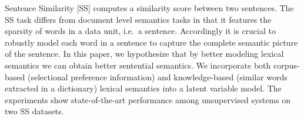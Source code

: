 Sentence Similarity [SS] computes a similarity score between two sentences. The SS task differs from document level semantics tasks in that it features the
 sparsity of words in a data unit, i.e.\ a sentence.  Accordingly it is crucial
 to robustly model each word in a sentence to capture the complete semantic
 picture of the sentence.  In this paper, we hypothesize that by better modeling
 lexical semantics we can obtain better sentential semantics.  We incorporate
 both corpus-based (selectional preference information) and knowledge-based
 (similar words extracted in a dictionary) lexical semantics into a latent
 variable model. The experiments show state-of-the-art performance among
 unsupervised systems on two SS datasets.

